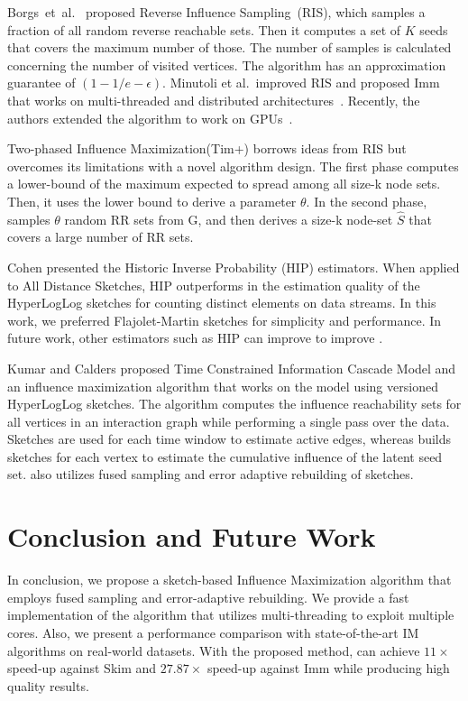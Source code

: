 \documentclass[10pt,journal,compsoc]{IEEEtran}
\newcommand\acro{{\sc{HyperFuseR\xspace}\xspace}\xspace}
\newcommand\maxspeedupIMM{{{27.87\xspace}\xspace}\xspace}
\newcommand\maxspeedupSKIM{{{11\xspace}\xspace}\xspace}
\begin{document}
Borgs~et~al.~\cite{borgs2014maximizing} proposed Reverse Influence Sampling~(RIS), which samples a fraction of all random reverse reachable sets. Then it computes a set of $K$ seeds that covers the maximum number of those. The number of samples is calculated concerning the number of visited vertices. The algorithm has an approximation guarantee of $(1-1/e-\epsilon)$. Minutoli et al.~improved RIS and proposed {\sc Imm} that works on multi-threaded and distributed architectures~\cite{minutoli2019fast}. 
Recently, the authors extended the algorithm to work on GPUs~\cite{curipples}.

Two-phased Influence Maximization({\sc Tim+})\cite{tim} borrows ideas from RIS but overcomes its limitations with a novel algorithm design. The first phase computes a lower-bound of the maximum expected to spread among all size-k node sets. Then, it uses the lower bound to derive a parameter $\theta$. In the second phase, samples $\theta$ random RR sets from G, and then derives a size-k node-set $\hat{S}$ that covers a large number of RR sets.

Cohen\cite{cohen2015all} presented the Historic Inverse Probability (HIP) estimators. When applied to All Distance Sketches, HIP outperforms in the estimation quality of the HyperLogLog sketches\cite{flajolet2007hyperloglog} for counting distinct elements on data streams. In this work, we preferred Flajolet-Martin\cite{flajolet1985probabilistic} sketches for simplicity and performance. In future work, other estimators such as HIP can improve to improve \acro.

Kumar and Calders\cite{kumar2017information} proposed Time Constrained Information
Cascade Model and an influence maximization algorithm that works on the model using versioned HyperLogLog sketches. The algorithm computes the influence reachability sets for all vertices in an interaction graph while performing a single pass over the data. Sketches are used for each time window to estimate active edges, whereas \acro builds sketches for each vertex to estimate the cumulative influence of the latent seed set. \acro also utilizes fused sampling and error adaptive rebuilding of sketches.

\section{Conclusion and Future Work}\label{sec:conclusion}

In conclusion, we propose a sketch-based Influence Maximization algorithm that employs fused sampling and error-adaptive rebuilding. We provide a fast implementation of the algorithm that utilizes multi-threading to exploit multiple cores. Also, we present a performance comparison with state-of-the-art IM algorithms on real-world datasets. 
With the proposed method, \acro can achieve $\maxspeedupSKIM\times$ speed-up against {\sc Skim} and $\maxspeedupIMM\times$ speed-up against {\sc Imm} while producing high quality results. 
\end{document}
